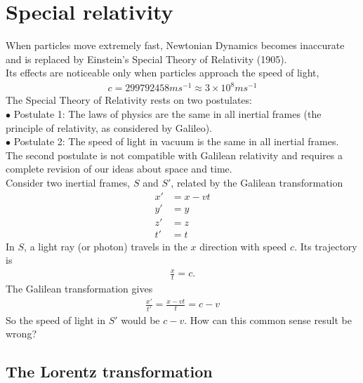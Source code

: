 \documentclass[a4paper]{article}
\begin{document}
\newpage
\section{Special relativity}
When particles move extremely fast, Newtonian Dynamics becomes inaccurate and is replaced by Einstein's Special Theory of Relativity (1905).\\
Its effects are noticeable only when particles approach the speed of light,
\begin{equation*}
\begin{aligned}
c=299792458 ms^{-1} \approx 3\times 10^8 ms^{-1}
\end{aligned}
\end{equation*}
The Special Theory of Relativity rests on two postulates:\\
$\bullet$ Postulate 1: The laws of physics are the same in all inertial frames (the principle of relativity, as considered by Galileo).\\
$\bullet$ Postulate 2: The speed of light in vacuum is the same in all inertial frames.\\
The second postulate is not compatible with Galilean relativity and requires a complete revision of our ideas about space and time.\\

Consider two inertial frames, $S$ and $S'$, related by the Galilean transformation
\begin{equation*}
\begin{aligned}
x'&=x-vt\\
y'&=y\\
z'&=z\\
t'&=t
\end{aligned}
\end{equation*}
In $S$, a light ray (or photon) travels in the $x$ direction with speed $c$. Its trajectory is
\begin{equation*}
\begin{aligned}
\frac{x}{t}=c.
\end{aligned}
\end{equation*}
The Galilean transformation gives
\begin{equation*}
\begin{aligned}
\frac{x'}{t'}=\frac{x-vt}{t}=c-v
\end{aligned}
\end{equation*}
So the speed of light in $S'$ would be $c-v$. How can this common sense result be wrong?

\subsection{The Lorentz transformation}
\end{document}
